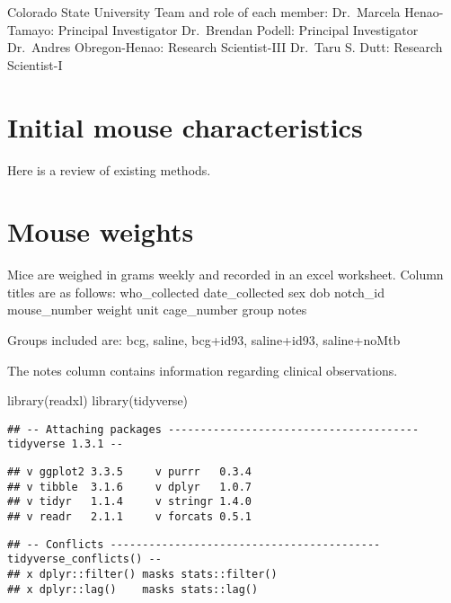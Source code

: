 \documentclass[
]{book}
\newenvironment{Shaded}{\begin{snugshade}}{\end{snugshade}}
\newcommand{\FunctionTok}[1]{\textcolor[rgb]{0.00,0.00,0.00}{#1}}
\newcommand{\NormalTok}[1]{#1}
\begin{document}
Colorado State University Team and role of each member:
Dr.~Marcela Henao-Tamayo: Principal Investigator
Dr.~Brendan Podell: Principal Investigator
Dr.~Andres Obregon-Henao: Research Scientist-III
Dr.~Taru S. Dutt: Research Scientist-I

\hypertarget{initial-mouse-characteristics}{%
\chapter{Initial mouse characteristics}\label{initial-mouse-characteristics}}

Here is a review of existing methods.

\hypertarget{mouse-weights}{%
\chapter{Mouse weights}\label{mouse-weights}}

Mice are weighed in grams weekly and recorded in an excel worksheet. Column titles are as follows: who\_collected date\_collected sex dob notch\_id mouse\_number weight unit cage\_number group notes

Groups included are: bcg, saline, bcg+id93, saline+id93, saline+noMtb

The notes column contains information regarding clinical observations.

\begin{Shaded}
\begin{Highlighting}[]
\FunctionTok{library}\NormalTok{(readxl)}
\FunctionTok{library}\NormalTok{(tidyverse)}
\end{Highlighting}
\end{Shaded}

\begin{verbatim}
## -- Attaching packages --------------------------------------- tidyverse 1.3.1 --
\end{verbatim}

\begin{verbatim}
## v ggplot2 3.3.5     v purrr   0.3.4
## v tibble  3.1.6     v dplyr   1.0.7
## v tidyr   1.1.4     v stringr 1.4.0
## v readr   2.1.1     v forcats 0.5.1
\end{verbatim}

\begin{verbatim}
## -- Conflicts ------------------------------------------ tidyverse_conflicts() --
## x dplyr::filter() masks stats::filter()
## x dplyr::lag()    masks stats::lag()
\end{verbatim}
\end{document}

